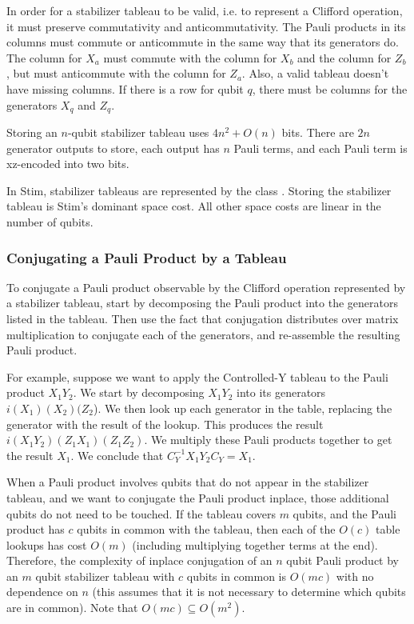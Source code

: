 \documentclass[onecolumn,unpublished]{quantumarticle}
\theoremstyle{definition}
\theoremstyle{definition}
\theoremstyle{definition}
\begin{document}
In order for a stabilizer tableau to be valid, i.e. to represent a Clifford operation, it must preserve commutativity and anticommutativity.
The Pauli products in its columns must commute or anticommute in the same way that its generators do.
The column for $X_a$ must commute with the column for $X_b$ and the column for $Z_b$, but must anticommute with the column for $Z_a$.
Also, a valid tableau doesn't have missing columns.
If there is a row for qubit $q$, there must be columns for the generators $X_q$ and $Z_q$.

Storing an $n$-qubit stabilizer tableau uses $4n^2 + O(n)$ bits.
There are $2n$ generator outputs to store, each output has $n$ Pauli terms, and each Pauli term is xz-encoded into two bits.

In Stim, stabilizer tableaus are represented by the class .
Storing the stabilizer tableau is Stim's dominant space cost.
All other space costs are linear in the number of qubits.

\subsubsection{Conjugating a Pauli Product by a Tableau}

To conjugate a Pauli product observable by the Clifford operation represented by a stabilizer tableau, start by decomposing the Pauli product into the generators listed in the tableau.
Then use the fact that conjugation distributes over matrix multiplication to conjugate each of the generators, and re-assemble the resulting Pauli product.

For example, suppose we want to apply the Controlled-Y tableau to the Pauli product $X_1 Y_2$.
We start by decomposing $X_1 Y_2$ into its generators $i (X_1) (X_2) (Z_2$).
We then look up each generator in the table, replacing the generator with the result of the lookup.
This produces the result $i (X_1 Y_2) (Z_1 X_1) (Z_1 Z_2)$.
We multiply these Pauli products together to get the result $X_1$.
We conclude that $C_Y^{-1} X_1 Y_2 C_Y = X_1$.

When a Pauli product involves qubits that do not appear in the stabilizer tableau, and we want to conjugate the Pauli product inplace, those additional qubits do not need to be touched.
If the tableau covers $m$ qubits, and the Pauli product has $c$ qubits in common with the tableau, then each of the $O(c)$ table lookups has cost $O(m)$ (including multiplying together terms at the end).
Therefore, the complexity of inplace conjugation of an $n$ qubit Pauli product by an $m$ qubit stabilizer tableau with $c$ qubits in common is $O(mc)$ with no dependence on $n$ (this assumes that it is not necessary to determine which qubits are in common).
Note that $O(mc) \subseteq O(m^2)$.
\end{document}
